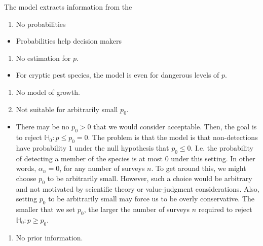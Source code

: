 \documentclass[
]{book}
\providecommand{\tightlist}{%
  \setlength{\itemsep}{0pt}\setlength{\parskip}{0pt}}
\begin{document}
The model extracts information from the

\begin{enumerate}
\def\labelenumi{\arabic{enumi}.}
\tightlist
\item
  No probabilities
\end{enumerate}

\begin{itemize}
\tightlist
\item
  Probabilities help decision makers
\end{itemize}

\begin{enumerate}
\def\labelenumi{\arabic{enumi}.}
\setcounter{enumi}{1}
\tightlist
\item
  No estimation for \(p\).
\end{enumerate}

\begin{itemize}
\tightlist
\item
  For cryptic pest species, the model is even for dangerous levels of \(p\).
\end{itemize}

\begin{enumerate}
\def\labelenumi{\arabic{enumi}.}
\setcounter{enumi}{2}
\tightlist
\item
  No model of growth.
\item
  Not suitable for arbitrarily small \(p_0\).
\end{enumerate}

\begin{itemize}
\tightlist
\item
  There may be no \(p_0 > 0\) that we would consider acceptable. Then, the goal is to reject \(\mathbb H_0: p \leq p_0 = 0\). The problem is that the model is that non-detections have probability \(1\) under the null hypothesis that \(p_0 \leq 0\). I.e. the probability of detecting a member of the species is at most \(0\) under this setting. In other words, \(\alpha_n = 0\), for any number of surveys \(n\). To get around this, we might choose \(p_0\) to be arbitrarily small. However, such a choice would be arbitrary and not motivated by scientific theory or value-judgment considerations. Also, setting \(p_0\) to be arbitrarily small may force us to be overly conservative. The smaller that we set \(p_0\), the larger the number of surveys \(n\) required to reject \(\mathbb H_0: p \geq p_0\).
\end{itemize}

\begin{enumerate}
\def\labelenumi{\arabic{enumi}.}
\setcounter{enumi}{4}
\tightlist
\item
  No prior information.
\end{enumerate}
\end{document}
